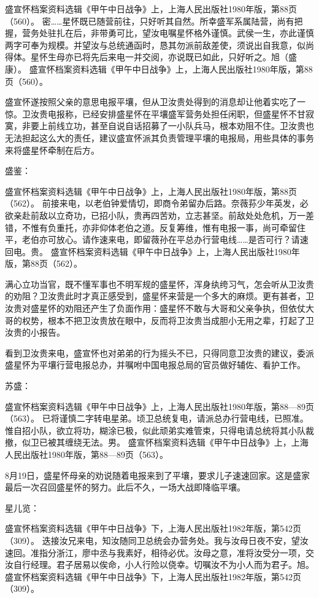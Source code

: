 \documentclass[12pt,UTF8]{ctexbook}
\begin{document}
盛宣怀档案资料选辑《甲午中日战争》上，上海人民出版社1980年版，第88页（560）。
密……星怀既已随营前往，只好听其自然。所幸盛军系属陆营，尚有把握，营务处驻扎在后，非带勇可比，望汝电嘱星怀格外谨慎。武侯一生，亦此谨慎两字可奉为规模。并望汝与总统通函时，恳其勿派前敌差使，须说出自我意，似尚得体。星怀生母亦已将先后来电一并交阅，亦说既已如此，只好听之。旭（盛康）。 盛宣怀档案资料选辑《甲午中日战争》上，上海人民出版社1980年版，第88页（560）。

盛宣怀遂按照父亲的意思电报平壤，但从卫汝贵处得到的消息却让他着实吃了一惊。卫汝贵电报称，已经安排盛星怀在平壤盛军营务处担任闲职，但盛星怀不甘寂寞，非要上前线立功，甚至自说自话招募了一小队兵马，根本劝阻不住。卫汝贵也无法担起这么大的责任，建议盛宣怀派其负责管理平壤的电报局，用些具体的事务来将盛星怀牵制在后方。

盛鉴：

盛宣怀档案资料选辑《甲午中日战争》上，上海人民出版社1980年版，第88页（562）。
前接来电，以老伯钟爱情切，即商令弟留办后路。奈薇荪少年英发，必欲亲赴前敌以立奇功，已招小队，贵再四苦劝，立志甚坚。前敌处处危机，万一差错，不惟有负重托，亦非仰体老伯之道。反复筹维，惟有电报一事，尚可牵留住平，老伯亦可放心。请作速来电，即留薇孙在平总办行营电线……是否可行？请速回电。贵。 盛宣怀档案资料选辑《甲午中日战争》上，上海人民出版社1980年版，第88页（562）。

满心立功当官，既不懂军事也不明军规的盛星怀，浑身纨绔习气，怎会听从卫汝贵的劝阻？卫汝贵此时才真正感受到，盛星怀来营是一个多大的麻烦。更有甚者，卫汝贵对盛星怀的劝阻还产生了负面作用：盛星怀不敢与大哥和父亲争执，但依仗大哥的权势，根本不把卫汝贵放在眼中，反而将卫汝贵当成胆小无用之辈，打起了卫汝贵的小报告。

看到卫汝贵来电，盛宣怀也对弟弟的行为摇头不已，只得同意卫汝贵的建议，委派盛星怀为平壤行营电报总办，并嘱咐中国电报总局的官员做好辅佐、看护工作。

苏盛：

盛宣怀档案资料选辑《甲午中日战争》上，上海人民出版社1980年版，第88—89页（563）。
已将谨慎二字转电星弟。顷卫总统复电，请派总办行营电线，已照准。惟自招小队，欲立将功，糊涂已极，似此顽弟实难管束，只得电请总统将其小队裁撤，似卫已被其缠绕无法。男。 盛宣怀档案资料选辑《甲午中日战争》上，上海人民出版社1980年版，第88—89页（563）。

8月19日，盛星怀母亲的劝说随着电报来到了平壤，要求儿子速速回家。这是盛家最后一次召回盛星怀的努力。此后不久，一场大战即降临平壤。

星儿览：

盛宣怀档案资料选辑《甲午中日战争》下，上海人民出版社1982年版，第542页（309）。
迭接汝兄来电，知汝随同卫总统会办营务处。我与汝母日夜不安，望汝速回。准指分浙江，廖中丞与我素好，相待必优。汝母之意，准将汝受分一项，交汝自行经理。君子居易以俟命，小人行险以侥幸。切嘱汝不为小人而为君子。旭。 盛宣怀档案资料选辑《甲午中日战争》下，上海人民出版社1982年版，第542页（309）。
\end{document}
